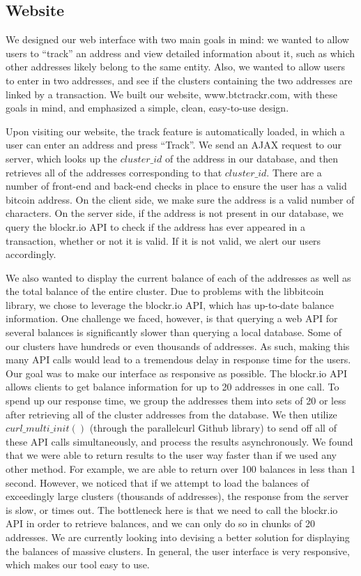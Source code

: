 \documentclass[10pt, letterpaper, twocolumn, twoside]{article}
\begin{document}
\subsection{Website}
We designed our web interface with two main goals in mind: we wanted to allow users to ``track'' an address and view detailed information about it, such as which other addresses likely belong to the same entity. Also, we wanted to allow users to enter in two addresses, and see if the clusters containing the two addresses are linked by a transaction. We built our website, www.btctrackr.com, with these goals in mind, and emphasized a simple, clean, easy-to-use design.

Upon visiting our website, the track feature is automatically loaded, in which a user can enter an address and press ``Track''. We send an AJAX request to our server, which looks up the $cluster\_id$ of the address in our database, and then retrieves all of the addresses corresponding to that $cluster\_id$. There are a number of front-end and back-end checks in place to ensure the user has a valid bitcoin address. On the client side, we make sure the address is a valid number of characters. On the server side, if the address is not present in our database, we query the blockr.io API to check if the address has ever appeared in a transaction, whether or not it is valid. If it is not valid, we alert our users accordingly.

We also wanted to display the current balance of each of the addresses as well as the total balance of the entire cluster. Due to problems with the libbitcoin library, we chose to leverage the blockr.io API, which has up-to-date balance information. One challenge we faced, however, is that querying a web API for several balances is significantly slower than querying a local database. Some of our clusters have hundreds or even thousands of addresses. As such, making this many API calls would lead to a tremendous delay in response time for the users. Our goal was to make our interface as responsive as possible. The blockr.io API allows clients to get balance information for up to 20 addresses in one call. To spend up our response time,  we group the addresses them into sets of 20 or less after retrieving all of the cluster addresses from the database. We then utilize $curl\_multi\_init()$ (through the parallelcurl Github library) to send off all of these API calls simultaneously, and process the results asynchronously. We found that we were able to return results to the user way faster than if we used any other method. For example, we are able to return over 100 balances in less than 1 second. However, we noticed that if we attempt to load the balances of exceedingly large clusters (thousands of addresses), the response from the server is slow, or times out. The bottleneck here is that we need to call the blockr.io API in order to retrieve balances, and we can only do so in chunks of 20 addresses. We are currently looking into devising a better solution for displaying the balances of massive clusters. In general, the user interface is very responsive, which makes our tool easy to use.
\end{document}
